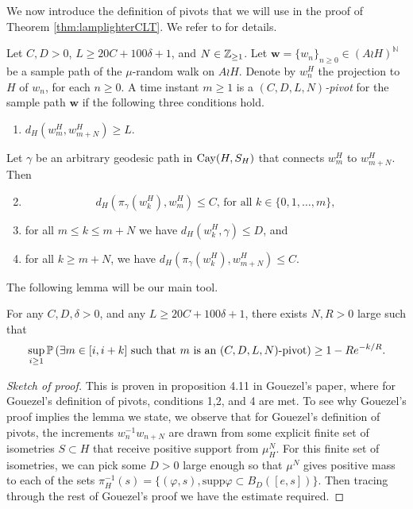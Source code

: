 We now introduce the definition of pivots that we will use in the proof of Theorem \ref{thm:lamplighterCLT}. We refer to \cite[Section 4A]{Gouezel2022} for details.

\begin{defin}
	Let $C,D>0$, $L\ge 20C+100\delta+1$, and $N\in \Z_{\ge 1}$. Let $\mathbf{w}=\{w_n\}_{n\ge 0} \in (A\wr H)^{\mathbb{N}}$ be a sample path of the $\mu$-random walk on $A\wr H$. Denote by $w_n^{H}$ the projection to $H$ of $w_n$, for each $n\ge 0$. A time instant $m\ge 1$ is a \emph{$(C,D,L,N)$-pivot} for the sample path $\mathbf{w}$ if the following three conditions hold. 
	\begin{enumerate}
		\item $d_{H}\left(w^{H}_m,w^{H}_{m+N}\right)\ge L$.
	\end{enumerate}

 Let $\gamma$ be an arbitrary geodesic path in $\cay{H}{S_H}$ that connects $w^{H}_m$ to $w^{H}_{m+N}.$ Then 
 
	\begin{enumerate}\setcounter{enumi}{1}
	\item
	\[ 
	d_H\left( \pi_{\gamma}\left(w^{H}_k\right),w^{H}_m \right)\le C \text{, for all }k\in\{0,1,\ldots, m\},
	\]
	\item for all $m\le k\le m+N$ we have $d_H\left(w^{H}_k, \gamma \right)\le D$, and
	\item for all $k\ge m+N$, we have $d_H\left( \pi_{\gamma}\left(w_k^H \right), w^{H}_{m+N} \right)\le C$.
\end{enumerate}
\end{defin}

The following lemma will be our main tool.

\begin{lem}
	For any $C, D, \delta>0$, and any $L\ge 20C+100\delta+1$, there exists $N,R>0$ large such that 
	\[
	\sup_{i\ge 1}\P\left(\exists m\in [i,i+k]\text{ such that }m\text{ is an } (C,D,L,N)\text{-pivot}\right)\ge 1-Re^{-k/R}.
	\]
\end{lem}
\begin{proof}[Sketch of proof]
	This is proven in proposition 4.11 in Gouezel's paper, where for Gouezel's definition of pivots, conditions 1,2, and 4 are met. To see why Gouezel's proof implies the lemma we state, we observe that for Gouezel's definition of pivots, the increments $ w _{n} ^{-1} w _{n+N} $ are drawn from some explicit finite set of isometries $ S \subset H $ that receive positive support from $ \mu_{H} ^{N} $. For this finite set of isometries, we can pick some $ D>0 $ large enough so that $ \mu ^{N} $ gives positive mass to each of the sets $ \pi _{H} ^{-1} (s) = \{(\varphi, s), \text{supp} \varphi \subset B _{D} ([e,s])\}$. Then tracing through the rest of Gouezel's proof we have the estimate required. 
\end{proof}


